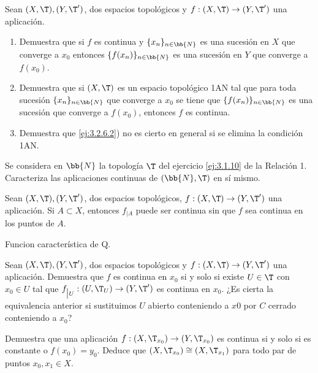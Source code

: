 \begin{ejercicio}
    Sean $(X, \T ), (Y, \T')$, dos espacios topológicos y $f : (X, \T ) \to (Y, \T')$ una aplicación.
    \begin{enumerate}
        \item Demuestra que si $f$ es continua y $\{x_n\}_{n\in \bb{N}}$ es una sucesión en $X$ que converge a $x_0$ entonces $\{f(x_n)\}_{n\in \bb{N}}$ es una sucesión en $Y$ que converge a $f(x_0)$.
    
        \item \label{ej:3.2.6.2}  Demuestra que si $(X, \T )$ es un espacio topológico 1AN tal que para toda sucesión
        $\{x_n\}_{n\in \bb{N}}$ que converge a $x_0$ se tiene que $\{f(x_n)\}_{n\in \bb{N}}$ es una sucesión que converge a $f(x_0)$, entonces $f$ es continua.
    
        \item Demuestra que \ref{ej:3.2.6.2}) no es cierto en general si se elimina la condición 1AN.
    \end{enumerate}
\end{ejercicio}

\begin{ejercicio}
    Se considera en $\bb{N}$ la topología $\T$ del ejercicio \ref{ej:3.1.10} de la Relación 1. Caracteriza las aplicaciones continuas de $(\bb{N},\T)$ en sí mismo.
\end{ejercicio}

\begin{ejercicio}
    Sean $(X, \T ), (Y, \T')$, dos espacios topológicos, $f : (X, \T ) \to (Y, \T')$ una aplicación. Si $A \subset X$, entonces $f_{\big| A}$ puede ser continua sin que $f$ sea continua en los puntos de $A$.


    Funcion característica de Q.
\end{ejercicio}

\begin{ejercicio}
    Sean $(X, \T ), (Y, \T')$, dos espacios topológicos y $f : (X, \T ) \to (Y, \T')$ una aplicación.
    Demuestra que $f$ es continua en $x_0$ si y solo si existe $U \in \T$ con $x_0 \in U$ tal que $f_{\big|U} : (U, \T_U ) \to (Y, \T')$ es continua en $x_0$. ¿Es cierta la equivalencia anterior si sustituimos $U$ abierto conteniendo a $x0$ por $C$ cerrado conteniendo a $x_0$?
\end{ejercicio}

\begin{ejercicio}
    Demuestra que una aplicación $f : (X, \T_{x_0}) \to (Y, \T_{x_0})$ es continua si y solo si es constante o $f(x_0) = y_0$. Deduce que $(X, \T_{x_0}) \cong (X, \T_{x_1})$ para todo par de puntos $x_0, x_1 \in X$.
\end{ejercicio}

